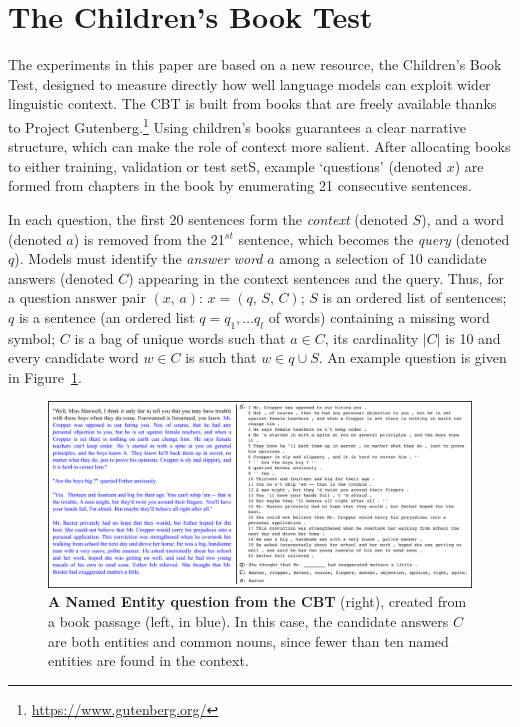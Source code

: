 \section{The Children's Book Test}

The experiments in this paper are based on a new resource, the Children's Book Test, designed to measure directly how well language models can exploit wider linguistic context. The CBT is built from books that are freely available thanks to Project Gutenberg.\footnote{\url{https://www.gutenberg.org/}} Using children's books guarantees a clear narrative structure, which can make the role of context more salient. After allocating books to either training, validation or test setS, example `questions' (denoted \(x\)) are formed from chapters in the book by enumerating 21 consecutive sentences. 

In each question, the first 20 sentences form the \emph{context} (denoted \(S\)), and a word (denoted \(a\)) is removed from the 21$^{st}$ sentence, which becomes the \emph{query} (denoted \(q\)). Models must identify the \emph{answer word} \(a\) among a selection of 10 candidate answers (denoted \(C\)) appearing in the context sentences and the query. Thus, for a question answer pair  $(x,\, a)$: $x = (q,\,S,\,C)$; \(S\) is an ordered list of sentences; \(q\) is a sentence (an ordered list \(q=q_1 , \dots q_l\) of words) containing a missing word symbol; \(C\) is  a bag of unique words such that \(a \in C\),  its cardinality \(|C|\) is 10 and every candidate word \(w \in C\) is such that \(w \in q \cup S\). An example question is given in Figure~\ref{fig:goldilocks}.

\begin{figure}[h]
\centering
\includegraphics[width=\textwidth]{Chapter_6/cbt_fig1.png}
\caption{{\bf A Named Entity question from the CBT} (right), created from a book passage (left, in blue). In this case, the candidate answers \(C\) are both entities and common nouns, since fewer than ten named entities are found in the context.}
\label{fig:goldilocks}
\end{figure}

